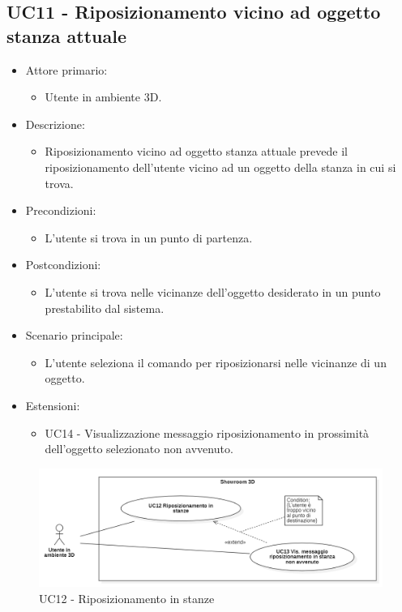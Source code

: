 \subsection{UC11 - Riposizionamento vicino ad oggetto stanza attuale}
\begin{itemize}

	\item Attore primario: 
	\begin{itemize}
		\item Utente in ambiente 3D.
	\end{itemize}
	\item Descrizione:
	\begin{itemize}
		\item Riposizionamento vicino ad oggetto stanza attuale prevede il riposizionamento dell'utente vicino ad un oggetto
della stanza in cui si trova.
	\end{itemize}
	
	\item Precondizioni:
	\begin{itemize}
		\item L'utente si trova in un punto di partenza.
	\end{itemize}
	
	\item Postcondizioni:
	\begin{itemize}
		\item L'utente si trova nelle vicinanze dell'oggetto desiderato in un punto prestabilito dal sistema.
	\end{itemize}
	
	\item Scenario principale:
	\begin{itemize}
		\item L'utente seleziona il comando per riposizionarsi nelle vicinanze di un oggetto.
	\end{itemize}

	\item Estensioni:
	\begin{itemize}
		\item UC14 - Visualizzazione messaggio riposizionamento in prossimità dell'oggetto selezionato non avvenuto.
	\end{itemize}
	
\end{itemize}

\pagebreak

\begin{figure}[H]
  \renewcommand{\thefigure}{17}
  \includegraphics[width=\linewidth]{./res/images/UC12-13.png}
  \caption{UC12 - Riposizionamento in stanze}
  \label{fig:UC 12 e UC13}
\end{figure}

